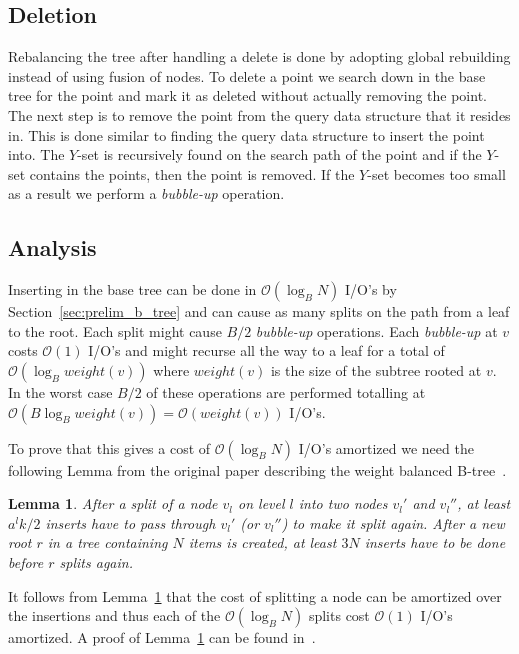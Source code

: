\documentclass[twoside,11pt,openright]{report}
\newtheorem{lemma}{Lemma}
\begin{document}
\subsection{Deletion}
Rebalancing the tree after handling a delete is done by adopting global rebuilding instead of using fusion of nodes. To delete a point we search down in the base tree for the point and mark it as deleted without actually removing the point. The next step is to remove the point from the query data structure that it resides in. This is done similar to finding the query data structure to insert the point into. The $Y$-set is recursively found on the search path of the point and if the $Y$-set contains the points, then the point is removed. If the $Y$-set becomes too small as a result we perform a \textit{bubble-up} operation.

\subsection{Analysis}
Inserting in the base tree can be done in $\mathcal{O}(\log_B N)$ I/O's by Section~\ref{sec:prelim_b_tree} and can cause as many splits on the path from a leaf to the root. Each split might cause $B/2$ \textit{bubble-up} operations. Each \textit{bubble-up} at $v$ costs $\mathcal{O}(1)$ I/O's and might recurse all the way to a leaf for a total of $\mathcal{O}(\log_B weight(v))$ where $weight(v)$ is the size of the subtree rooted at $v$. In the worst case $B/2$ of these operations are performed totalling at $\mathcal{O}(B\log_B weight(v)) = \mathcal{O}(weight(v))$ I/O's.

To prove that this gives a cost of $\mathcal{O}(\log_B N)$ I/O's amortized we need the following Lemma from the original paper describing the weight balanced B-tree~\cite{arge_vitter_1996}.
\begin{lemma}
\label{lma:weight_balanced}
After a split of a node $v_l$ on level $l$ into two nodes $v_l'$ and $v_l''$, at least $a^lk/2$ inserts have to pass through $v_l'$ (or $v_l''$) to make it split again. After a new root $r$ in a tree containing $N$ items is created, at least $3N$ inserts have to be done before $r$ splits again.
\end{lemma}

It follows from Lemma~\ref{lma:weight_balanced} that the cost of splitting a node can be amortized over the insertions and thus each of the $\mathcal{O}(\log_B N)$ splits cost $\mathcal{O}(1)$ I/O's amortized.
A proof of Lemma~\ref{lma:weight_balanced} can be found in~\cite{arge_vitter_1996}.
\end{document}
